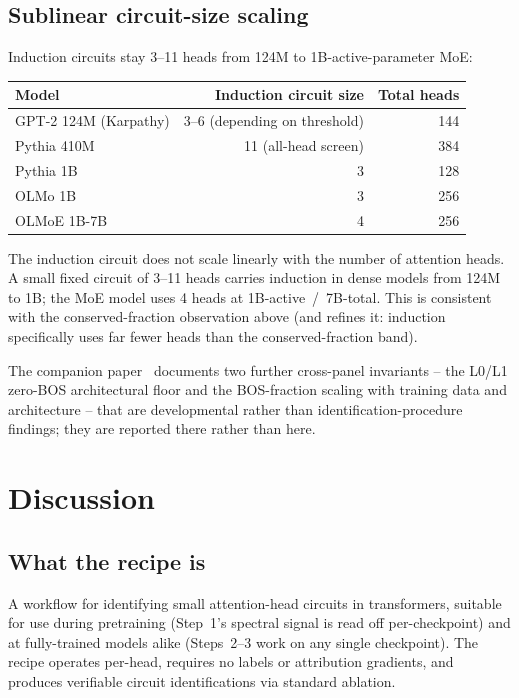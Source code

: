 \documentclass[11pt]{article}
\begin{document}
\subsection{Sublinear circuit-size scaling}

Induction circuits stay 3--11 heads from 124M to 1B-active-parameter MoE:

\begin{center}
\small
\begin{tabular}{lrr}
\toprule
Model & Induction circuit size & Total heads \\
\midrule
GPT-2 124M (Karpathy) & 3--6 (depending on threshold) & 144 \\
Pythia 410M           & 11 (all-head screen) & 384 \\
Pythia 1B             & 3 & 128 \\
OLMo 1B               & 3 & 256 \\
OLMoE 1B-7B           & 4 & 256 \\
\bottomrule
\end{tabular}
\end{center}

The induction circuit does not scale linearly with the number of attention heads. A small fixed circuit of 3--11 heads carries induction in dense models from 124M to 1B; the MoE model uses 4 heads at 1B-active~/~7B-total. This is consistent with the conserved-fraction observation above (and refines it: induction specifically uses far fewer heads than the conserved-fraction band).

The companion paper~\citep{paper2_developmental} documents two further cross-panel invariants -- the L0/L1 zero-BOS architectural floor and the BOS-fraction scaling with training data and architecture -- that are developmental rather than identification-procedure findings; they are reported there rather than here.

\section{Discussion}

\subsection{What the recipe is}

A workflow for identifying small attention-head circuits in transformers, suitable for use during pretraining (Step~1's spectral signal is read off per-checkpoint) and at fully-trained models alike (Steps~2--3 work on any single checkpoint). The recipe operates per-head, requires no labels or attribution gradients, and produces verifiable circuit identifications via standard ablation.
\end{document}

